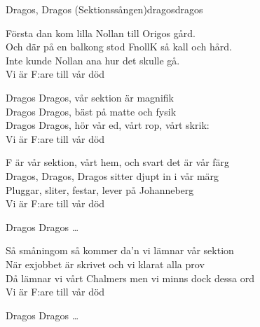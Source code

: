 \begin{song}{Dragos, Dragos (Sektionssången)}{dragosdragos}

\begin{vers}
Första dan kom lilla Nollan till Origos gård.\\
Och där på en balkong stod FnollK så kall och hård.\\
Inte kunde Nollan ana hur det skulle gå.\\
Vi är F:are till vår död \\
\end{vers}

\begin{vers}
Dragos Dragos, vår sektion är magnifik \\
Dragos Dragos, bäst på matte och fysik \\
Dragos Dragos, hör vår ed, vårt rop, vårt skrik:\\
Vi är F:are till vår död \\
\end{vers}

\begin{vers}
F är vår sektion, vårt hem, och svart det är vår färg\\
Dragos, Dragos, Dragos sitter djupt in i vår märg\\
Pluggar, sliter, festar, lever på Johanneberg\\
Vi är F:are till vår död\\
\end{vers}

\begin{vers}
Dragos Dragos \ldots
\end{vers}

\begin{vers}
Så småningom så kommer da'n vi lämnar vår sektion\\
När exjobbet är skrivet och vi klarat alla prov\\
Då lämnar vi vårt Chalmers men vi minns dock dessa ord\\
Vi är F:are till vår död\\
\end{vers}

\begin{vers}
Dragos Dragos \ldots
\end{vers}
\end{song}

\iffalse

